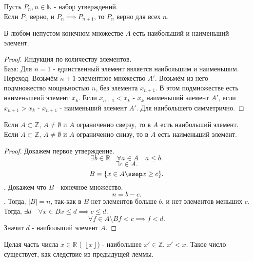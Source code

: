 \documentclass[11pt, oneside]{article}   	%
\begin{document}
    \begin{definition}
        Пусть  $P_n, n \in \mathbb{N}$ -  набор утверждений.\\
        Если $P_1$ верно, и  $P_n \implies P_{n+1}$, то $P_n$ верно для всех  $n$.
    \end{definition}
    \begin{theorem}
        В любом непустом конечном множестве $A$ есть наибольший и наименьший элемент.
        \begin{proof}
            Индукция по количеству элементов.\\
            База: Для $n=1$ - единственный элемент является наибольшим и наименьшим.\\
            Переход: Возьмём $n+1$-элементное множество  $A'$. Возьмём из него подмножество мощньностью  $n$, без элемента $x_{n+1}$. В этом подмножестве есть наименьшеий элемент  $x_k$. Если $x_{n+1}<x_k$ - $x_k$ наименьший элемент  $A'$, если  $x_{n+1}>x_k$ - $x_{n+1}$ - наименьший элемент $A'$. Для наибольшего симметрично.
        \end{proof}
    \end{theorem}
    \begin{tlemma}
        Если $A \subset \mathbb{Z}$, $A\neq \emptyset$ и $A$ ограниченно сверзу, то в  $A$ есть наибольший элемент.\\
        Если  $A \subset \mathbb{Z}$, $A \neq  \emptyset$ и $A$ ограниченно снизу, то в  $A$ есть наименьший элемент.
         \begin{proof}
            Докажем первое утверждение.
            \[ \exists{b \in \mathbb{R}}\quad \forall{a \in A}\quad a\le b .\]
            \[ \exists{c \in A} .\] 
            \[ B = \{x \in A\ssep x \ge c\}  .\].
            Докажем что $B$ - конечное множество.
            \[ n=b-c .\].
            Тогда, $|B| = n$, так-как в  $B$ нет элементов больше  $b$, и нет элементов меньших  $c$.\\
            Тогда,  $\exists{d}\quad \forall{x \in B} x\le d \implies c\le d $.
            \[ \forall{f \in A\setminus B} f<c \implies f<d .\]
            Значит $d$ - наибольший элемент  $A$.
        \end{proof}
    \end{tlemma}
    \begin{definition}
        Целая часть числа $x \in \mathbb{R}$ ( $\left\lfloor x \right\rfloor$) - наибольшее $x' \in \mathbb{Z}$, $x' < x$. Такое число существует, как следствие из предыдущей леммы.
    \end{definition}
\end{document}
